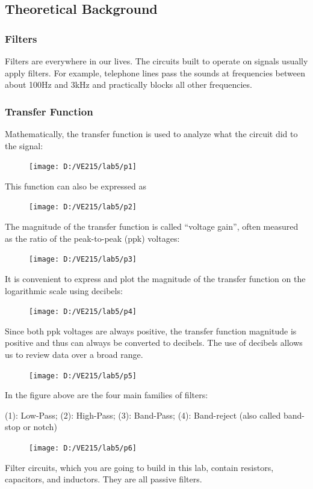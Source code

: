 \documentclass{article}
\begin{document}
\subsection{Theoretical Background}
\subsubsection{Filters}
Filters are everywhere in our lives. The circuits built to operate on signals usually
apply filters. For example, telephone lines pass the sounds at frequencies between about
100Hz and 3kHz and practically blocks all other frequencies.
\subsubsection{Transfer Function}
Mathematically, the transfer function is used to analyze what the circuit did to the
signal:
\begin{figure}[H]
	\centering
	\texttt{[image: D:/VE215/lab5/p1]}
	\label{fig:p1}
\end{figure}
This function can also be expressed as 
\begin{figure}[H]
	\centering
	\texttt{[image: D:/VE215/lab5/p2]}
	\label{fig:p2}
\end{figure}
The magnitude of the transfer function is called “voltage gain”, often measured
as the ratio of the peak-to-peak (ppk) voltages:
\begin{figure}[H]
	\centering
	\texttt{[image: D:/VE215/lab5/p3]}
	\label{fig:p3}
\end{figure}
It is convenient to express and plot the magnitude of the transfer function on the
logarithmic scale using decibels:
\begin{figure}[H]
	\centering
	\texttt{[image: D:/VE215/lab5/p4]}
	\label{fig:p4}
\end{figure}
Since both ppk voltages are always positive, the transfer function magnitude is
positive and thus can always be converted to decibels. The use of decibels allows us
to review data over a broad range.
\begin{figure}[H]
	\centering
	\texttt{[image: D:/VE215/lab5/p5]}
	\label{fig:p5}
\end{figure}
In the figure above are the four main families of filters:

(1): Low-Pass; (2): High-Pass; (3): Band-Pass; (4): Band-reject (also called
band-stop or notch)
\begin{figure}[H]
	\centering
	\texttt{[image: D:/VE215/lab5/p6]}
	\label{fig:p6}
\end{figure}
Filter circuits, which you are going to build in this lab, contain resistors,
capacitors, and inductors. They are all passive filters.
\end{document}
